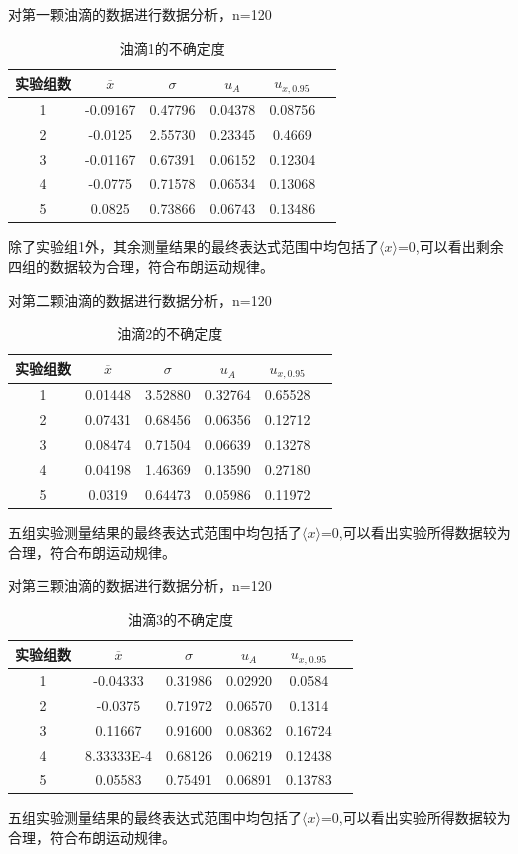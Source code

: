 \documentclass[12pt,a4paper,UTF8]{ctexart}
\begin{document}
\begin{enumerate}
对第一颗油滴的数据进行数据分析，n=120\par
\begin{table}[htbp]
  \centering
  \begin{tabular}{cccccc}
    \toprule
    实验组数 &$\overline{x}$ &$\sigma$  & $u_{A}$&$u_{x,0.95} $\\
    \midrule
    1 &-0.09167&0.47796 &0.04378 &0.08756 \\
    2 &-0.0125&2.55730 &0.23345  &0.4669\\
    3 &-0.01167&0.67391 &0.06152  &0.12304\\
    4 &-0.0775&0.71578 &0.06534  &0.13068\\
    5 &0.0825&0.73866 &0.06743  &0.13486\\
    \bottomrule
  \end{tabular}
  \caption{油滴1的不确定度}
  \label{tab:data}
\end{table}
除了实验组1外，其余测量结果的最终表达式范围中均包括了$\langle x \rangle$=0,可以看出剩余四组的数据较为合理，符合布朗运动规律。


对第二颗油滴的数据进行数据分析，n=120
\par
\begin{table}[htbp]
  \centering
  \begin{tabular}{cccccc}
    \toprule
    实验组数 &$\overline{x}$ &$\sigma$  & $u_{A}$&$u_{x,0.95} $\\
    \midrule
    1 &0.01448&3.52880 &0.32764&0.65528  \\
    2 &0.07431&0.68456 &0.06356&0.12712 \\
    3 &0.08474&0.71504 &0.06639&0.13278  \\
    4 &0.04198&1.46369 &0.13590&0.27180  \\
    5 &0.0319&0.64473 &0.05986&0.11972  \\
    \bottomrule
  \end{tabular}
  \caption{油滴2的不确定度}
  \label{tab:data}
\end{table}
五组实验测量结果的最终表达式范围中均包括了$\langle x \rangle$=0,可以看出实验所得数据较为合理，符合布朗运动规律。
\par
对第三颗油滴的数据进行数据分析，n=120
\par
\begin{table}[htbp]
  \centering
  \begin{tabular}{cccccc}
    \toprule
   实验组数 &$\overline{x}$ &$\sigma$  & $u_{A}$&$u_{x,0.95} $\\
    \midrule
    1 &-0.04333&0.31986 &0.02920 & 0.0584\\
    2 &-0.0375&0.71972 &0.06570 &0.1314\\
    3 &0.11667&0.91600 &0.08362 & 0.16724\\
    4 &8.33333E-4&0.68126 &0.06219 &0.12438\\
    5 &0.05583&0.75491 &0.06891 &0.13783 \\
    \bottomrule
  \end{tabular}
  \caption{油滴3的不确定度}
  \label{tab:data}
\end{table}
五组实验测量结果的最终表达式范围中均包括了$\langle x \rangle$=0,可以看出实验所得数据较为合理，符合布朗运动规律。


\end{enumerate}
\end{document}
